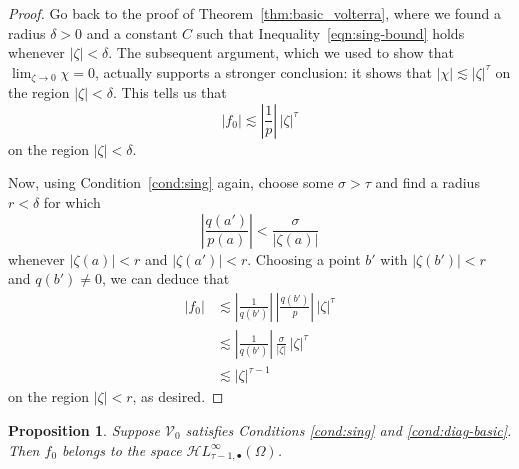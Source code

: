 \documentclass{article}
\theoremstyle{definition}
\theoremstyle{plain}
\newtheorem{prop}{Proposition}
\newcommand{\singexp}[2]{\mathcal{H}L^\infty_{#1, #2}}
\newcommand{\singexpalg}[1]{\singexp{#1}{\bullet}}
\newcommand{\hardpart}{\mathcal{V}_0}
\newcommand{\solproto}{f_0}
\newcommand{\domain}{\Omega}
\begin{document}
\begin{proof}
Go back to the proof of Theorem~\ref{thm:basic_volterra}, where we found a radius $\delta > 0$ and a constant $C$ such that Inequality~\eqref{eqn:sing-bound} holds whenever $|\zeta| < \delta$. The subsequent argument, which we used to show that $\lim_{\zeta \to 0} \chi = 0$, actually supports a stronger conclusion: it shows that $|\chi| \lesssim |\zeta|^\tau$ on the region $|\zeta| < \delta$. This tells us that
\[ |\solproto| \lesssim \left|\frac{1}{p}\right|\,|\zeta|^\tau \]
on the region $|\zeta| < \delta$.

Now, using Condition~\eqref{cond:sing} again, choose some $\sigma > \tau$ and find a radius $r < \delta$ for which
\[ \left|\frac{q(a')}{p(a)}\right| < \frac{\sigma}{|\zeta(a)|} \]
whenever $|\zeta(a)| < r$ and $|\zeta(a')| < r$. Choosing a point $b'$ with $|\zeta(b')| < r$ and $q(b') \neq 0$, we can deduce that
\begin{align*}
|\solproto| & \lesssim \left|\frac{1}{q(b')}\right|\,\left|\frac{q(b')}{p}\right|\,|\zeta|^\tau \\
& \lesssim \left|\frac{1}{q(b')}\right|\,\frac{\sigma}{|\zeta|}\,|\zeta|^\tau \\
& \lesssim |\zeta|^{\tau-1}
\end{align*}
on the region $|\zeta| < r$, as desired.
\end{proof}
\begin{prop}\label{prop:asymptotic at infinity}
Suppose $\hardpart$ satisfies {\em Conditions \eqref{cond:sing}} and \eqref{cond:diag-basic}. Then $\solproto$ belongs to the space $\singexpalg{\tau-1}(\domain)$.
\end{prop}
\end{document}
